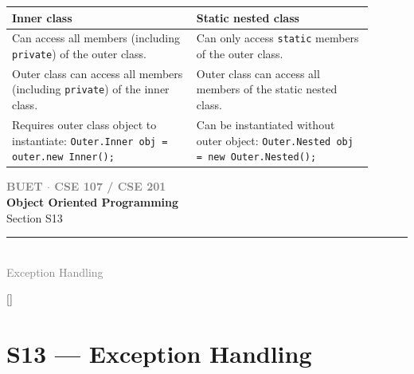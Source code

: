 \documentclass[12pt,a3paper]{article}
\newcommand{\secdivider}[4]{%
  \newpage\thispagestyle{empty}%
  \vspace*{\fill}%
  \begin{tcolorbox}[enhanced,colback=#4!7,colframe=#3,boxrule=1.5pt,arc=8pt,
    left=20pt,right=20pt,top=22pt,bottom=22pt,
    shadow={3pt}{-3pt}{0pt}{black!15}]
    \centering
    {\large\textcolor{gray}{\textbf{BUET $\cdot$ CSE 107 / CSE 201}}}\\[8pt]
    {\fontsize{26}{32}\selectfont\bfseries\textcolor{#3}{Object Oriented Programming}}\\[6pt]
    {\fontsize{15}{19}\selectfont\textcolor{dgray}{#1}}\\[12pt]
    \textcolor{#3!60}{\rule{0.5\textwidth}{0.5pt}}\\[6pt]
    {\small\textcolor{gray}{#2}}
  \end{tcolorbox}%
  \vspace*{\fill}\newpage%
}
\begin{document}
\begin{enumerate}
\begin{tcolorbox}[enhanced,breakable,ansbox,
  colback=cD!4,colframe=cD,boxrule=0.8pt,arc=5pt,
  title={\textbf{Answer --- Types of Nested Classes \& Access Rules}},
  fonttitle=\bfseries\color{white},colbacktitle=cD]
\begin{center}
\small
\begin{tabular}{@{}p{0.46\linewidth}p{0.44\linewidth}@{}}
\toprule
\textbf{Inner class} & \textbf{Static nested class} \\
\midrule
Can access all members (including \texttt{private}) of the outer class. &
Can only access \texttt{static} members of the outer class. \\[4pt]
Outer class can access all members (including \texttt{private}) of the inner class. &
Outer class can access all members of the static nested class. \\[4pt]
Requires outer class object to instantiate:
\texttt{Outer.Inner obj = outer.new Inner();} &
Can be instantiated without outer object:
\texttt{Outer.Nested obj = new Outer.Nested();} \\
\bottomrule
\end{tabular}
\end{center}

\end{tcolorbox}


\end{enumerate}
\newpage

\secdivider{Section S13}{Exception Handling}{cE}{cE}
\label{sec:S13}
\titleformat{\section}{\large\bfseries\color{cE}}{}{0em}{}[\titlerule]
\section{S13 --- Exception Handling}
\end{document}
